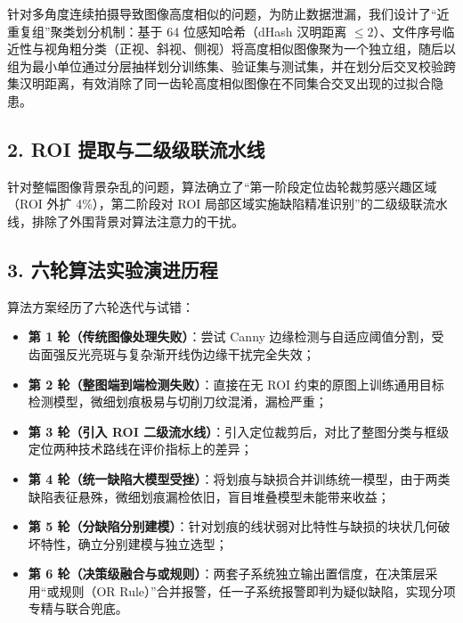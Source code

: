 针对多角度连续拍摄导致图像高度相似的问题，为防止数据泄漏，我们设计了“近重复组”聚类划分机制：基于 64 位感知哈希（dHash 汉明距离 $\le 2$）、文件序号临近性与视角粗分类（正视、斜视、侧视）将高度相似图像聚为一个独立组，随后以组为最小单位通过分层抽样划分训练集、验证集与测试集，并在划分后交叉校验跨集汉明距离，有效消除了同一齿轮高度相似图像在不同集合交叉出现的过拟合隐患。

\subsection*{2. ROI 提取与二级级联流水线}
针对整幅图像背景杂乱的问题，算法确立了“第一阶段定位齿轮裁剪感兴趣区域（ROI 外扩 4\%），第二阶段对 ROI 局部区域实施缺陷精准识别”的二级级联流水线，排除了外围背景对算法注意力的干扰。

\subsection*{3. 六轮算法实验演进历程}
算法方案经历了六轮迭代与试错：
\begin{itemize}
    \item \textbf{第 1 轮（传统图像处理失败）}：尝试 Canny 边缘检测与自适应阈值分割，受齿面强反光亮斑与复杂渐开线伪边缘干扰完全失效；
    \item \textbf{第 2 轮（整图端到端检测失败）}：直接在无 ROI 约束的原图上训练通用目标检测模型，微细划痕极易与切削刀纹混淆，漏检严重；
    \item \textbf{第 3 轮（引入 ROI 二级流水线）}：引入定位裁剪后，对比了整图分类与框级定位两种技术路线在评价指标上的差异；
    \item \textbf{第 4 轮（统一缺陷大模型受挫）}：将划痕与缺损合并训练统一模型，由于两类缺陷表征悬殊，微细划痕漏检依旧，盲目堆叠模型未能带来收益；
    \item \textbf{第 5 轮（分缺陷分别建模）}：针对划痕的线状弱对比特性与缺损的块状几何破坏特性，确立分别建模与独立选型；
    \item \textbf{第 6 轮（决策级融合与或规则）}：两套子系统独立输出置信度，在决策层采用“或规则（OR Rule）”合并报警，任一子系统报警即判为疑似缺陷，实现分项专精与联合兜底。
\end{itemize}

